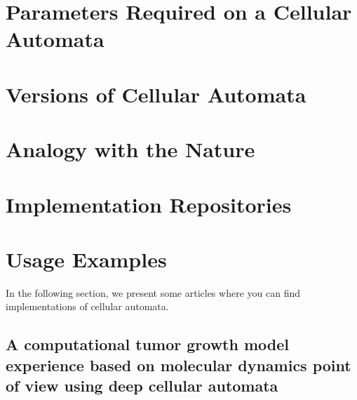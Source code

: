 \documentclass[9pt,a4paper,twoside]{tau-class/tau}
\begin{document}
\section{Parameters Required on a Cellular Automata}



\section{Versions of Cellular Automata}


\section{Analogy with the Nature}
    

\section{Implementation Repositories}



\section{Usage Examples}
In the following section, we present some articles where you can find implementations of cellular automata.

\subsection{ A computational tumor growth model experience based on molecular dynamics point of view using deep cellular automata }
\end{document}
